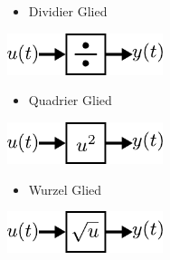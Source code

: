 \begin{figure}[h]
	\begin{subfigure}[c]{\textwidth}
		\begin{minipage}{0.5\textwidth}
			\begin{itemize}
				\item Dividier Glied
			\end{itemize}
		\end{minipage}
		\begin{minipage}{0.5\textwidth}
			\centering
			\includegraphics[width=0.5\textwidth]{Abbildungen/Modellbildung/PDF/Dividierer.pdf}
		\end{minipage}
	\end{subfigure} 
	\vspace{1cm}
	\begin{subfigure}[c]{\textwidth}
		\begin{minipage}{0.5\textwidth}
			\begin{itemize}
				\item Quadrier Glied
			\end{itemize}
		\end{minipage}\hfill
		\begin{minipage}{0.5\textwidth}
			\centering
			\includegraphics[width=0.5\textwidth]{Abbildungen/Modellbildung/PDF/Quadrierer.pdf}
		\end{minipage}
	\end{subfigure} 
	\vspace{1cm}
	\begin{subfigure}[c]{\textwidth}
		\begin{minipage}{0.5\textwidth}
			\begin{itemize}
				\item Wurzel Glied
			\end{itemize}
		\end{minipage}\hfill
		\begin{minipage}{0.5\textwidth}
			\centering
			\includegraphics[width=0.5\textwidth]{Abbildungen/Modellbildung/PDF/Ratifizierer.pdf}

\end{minipage}
\end{subfigure}
\end{figure}
